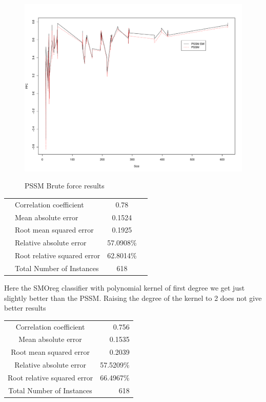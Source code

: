 \begin{figure}
\begin{center}
\includegraphics[width=13cm]{fig/pssm1.pdf}
\label{fig:pssm1}
\caption{PSSM Brute force results}
\end{center}
\end{figure}

\begin{table}[ht]
\begin{center}
\begin{tabular}{ ll c r }
\hline
 & Correlation coefficient &                 0.78  \\
 & Mean absolute error      &                0.1524 \\
 & Root mean squared error   &               0.1925 \\
 & Relative absolute error    &             57.0908\%  \\
 & Root relative squared error &            62.8014\%  \\
 & Total Number of Instances    &          618 \\
\hline
\end{tabular}
\end{center}
\end{table}


Here the SMOreg classifier with polynomial kernel of first degree we get just slightly better than the PSSM. Raising the degree of the kernel to 2 does not give better results

\begin{table}[ht]
\begin{center}
\begin{tabular}{ c r }
Correlation coefficient &                 0.756 \\
Mean absolute error      &                0.1535 \\
Root mean squared error   &               0.2039 \\
Relative absolute error   &              57.5209\% \\
Root relative squared error &            66.4967\% \\
Total Number of Instances    &          618 \\
\end{tabular}
\end{center}
\end{table}

